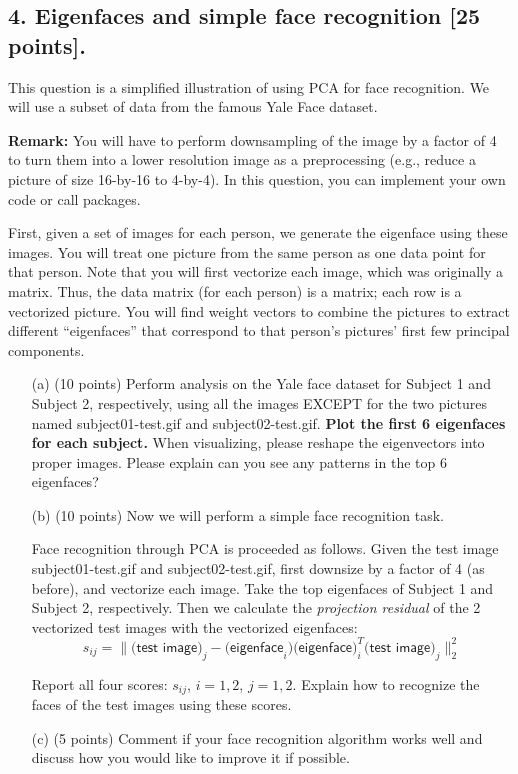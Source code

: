 \documentclass[twoside,10pt]{article}
\begin{document}
\clearpage

\subsection*{4. Eigenfaces and simple face recognition [25 points].}

This question is a simplified illustration of using PCA for face recognition. We will use a subset of data from the famous Yale Face dataset. 

\vspace{.1in}
\noindent
{\bf Remark:} You will have to perform downsampling of the image by a factor of 4 to turn them into a lower resolution image as a preprocessing (e.g., reduce a picture of size 16-by-16 to 4-by-4). In this question, you can implement your own code or call packages. 

First, given a set of images for each person, we generate the eigenface using these images. You will treat one picture from the same person as one data point for that person. Note that you will first vectorize each image, which was originally a matrix. Thus, the data matrix (for each person) is a matrix; each row is a vectorized picture. You will find weight vectors to combine the pictures to extract different ``eigenfaces'' that correspond to that person's pictures' first few principal components. 


\begin{enumerate}

\item[(a)] (10 points) Perform analysis on the Yale face dataset for Subject 1 and Subject 2, respectively, using all the images EXCEPT for the two pictures named \textsf{subject01-test.gif} and \textsf{subject02-test.gif}. {\bf Plot the first 6 eigenfaces for each subject.} When visualizing, please reshape the eigenvectors into proper images. Please explain can you see any patterns in the top 6 eigenfaces?

\item[(b)] (10 points) Now we will perform a simple face recognition task. 

Face recognition through PCA is proceeded as follows. Given the test image \textsf{subject01-test.gif} and \textsf{subject02-test.gif}, first downsize by a factor of 4 (as before), and vectorize each image. Take the top eigenfaces of Subject 1 and Subject 2, respectively. Then we calculate the {\it projection residual} of the 2 vectorized test images with the vectorized eigenfaces:
\[s_{ij} = \|\textsf{(test image)}_j - \textsf{(eigenface}_i)\textsf{(eigenface})_i^T \textsf{(test image)}_j\|_2^2\]

Report all four scores: $s_{ij}$, $i = 1, 2$, $j = 1, 2.$ Explain how to recognize the faces of the test images using these scores. 

\item[(c)] (5 points) Comment if your face recognition algorithm works well and discuss how you would like to improve it if possible.

\end{enumerate}
\end{document}
